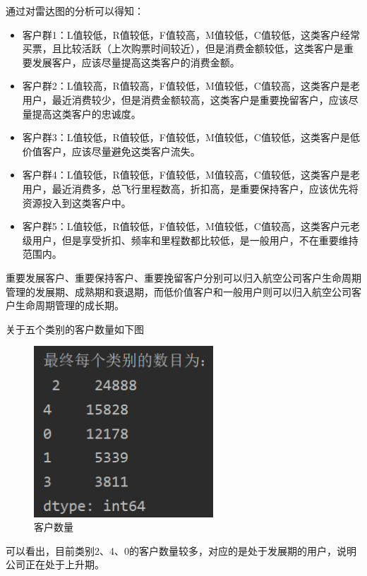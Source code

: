 \documentclass[UTF8,12pt]{article}
\begin{document}
通过对雷达图的分析可以得知：

\begin{itemize}
    \item 客户群1：L值较低，R值较低，F值较高，M值较低，C值较低，这类客户经常买票，且比较活跃（上次购票时间较近），但是消费金额较低，这类客户是重要发展客户，应该尽量提高这类客户的消费金额。
    \item 客户群2：L值较高，R值较高，F值较低，M值较低，C值较高，这类客户是老用户，最近消费较少，但是消费金额较高，这类客户是重要挽留客户，应该尽量提高这类客户的忠诚度。
    \item 客户群3：L值较低，R值较低，F值较低，M值较低，C值较低，这类客户是低价值客户，应该尽量避免这类客户流失。
    \item 客户群4：L值较低，R值较低，F值较低，M值较高，C值较低，这类客户是老用户，最近消费多，总飞行里程数高，折扣高，是重要保持客户，应该优先将资源投入到这类客户中。
    \item 客户群5：L值较低，R值较低，F值较低，M值较低，C值较高，这类客户元老级用户，但是享受折扣、频率和里程数都比较低，是一般用户，不在重要维持范围内。
\end{itemize}

重要发展客户、重要保持客户、重要挽留客户分别可以归入航空公司客户生命周期管理的发展期、成熟期和衰退期，而低价值客户和一般用户则可以归入航空公司客户生命周期管理的成长期。

关于五个类别的客户数量如下图

\begin{figure}[htbp]
    \centering
    \includegraphics[width=0.6\textwidth]{img/17.png}
    \caption{客户数量}
\end{figure}

可以看出，目前类别2、4、0的客户数量较多，对应的是处于发展期的用户，说明公司正在处于上升期。
\end{document}
